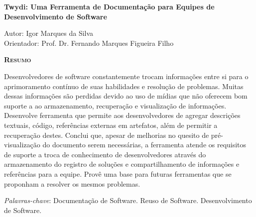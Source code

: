 \begin{center}
	{\Large{\textbf{Twydi: Uma Ferramenta de Documentação para Equipes de Desenvolvimento de Software}}}
\end{center}

\vspace{1cm}

\begin{flushright}
	Autor: Igor Marques da Silva\\
	Orientador: Prof. Dr. Fernando Marques Figueira Filho
\end{flushright}

\vspace{1cm}

\begin{center}
	\Large{\textsc{\textbf{Resumo}}}
\end{center}

\noindent Desenvolvedores de software constantemente trocam informações entre si para o aprimoramento contínuo de suas habilidades e resolução de problemas. Muitas dessas informações são perdidas devido ao uso de mídias que não oferecem bom suporte a ao armazenamento, recuperação e visualização de informações.
Desenvolve ferramenta que permite aos desenvolvedores de agregar descrições textuais, código, referências externas em artefatos, além de permitir a recuperação destes. Conclui que, apesar de melhorias no quesito de pré-visualização do documento serem necessárias, a ferramenta atende os requisitos de suporte a troca de conhecimento de desenvolvedores através do armazenamento do registro de soluções e compartilhamento de informações e  referências para a equipe. Provê uma base para futuras ferramentas que se proponham a resolver os mesmos problemas.

\noindent\textit{Palavras-chave}: Documentação de Software. Reuso de Software. Desenvolvimento de Software.
